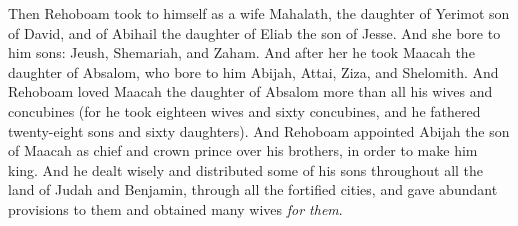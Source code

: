 \begin{biblechapter}
 Then Rehoboam took to himself as a wife Mahalath, the daughter of Yerimot son of David, and of Abihail the daughter of Eliab the son of Jesse.
\verse And she bore to him sons: Jeush, Shemariah, and Zaham.
\verse And after her he took Maacah the daughter of Absalom, who bore to him Abijah, Attai, Ziza, and Shelomith.
\verse And Rehoboam loved Maacah the daughter of Absalom more than all his wives and concubines (for he took eighteen wives and sixty concubines, and he fathered twenty-eight sons and sixty daughters).
\verse And Rehoboam appointed Abijah the son of Maacah as chief and crown prince over his brothers, in order to make him king.
\verse And he dealt wisely and distributed some of his sons throughout all the land of Judah and Benjamin, through all the fortified cities, and gave abundant provisions to them and obtained many wives \textit{for them}.
\end{biblechapter}


